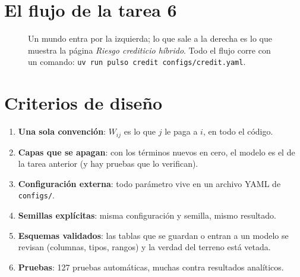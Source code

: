 \section{El flujo de la tarea 6}
\begin{figure}[h]
\centering
{}
\caption{Un mundo entra por la izquierda; lo que sale a la derecha es lo que
muestra la página \emph{Riesgo crediticio híbrido}. Todo el flujo corre con un
comando: \texttt{uv run pulso credit configs/credit.yaml}.}
\end{figure}

\section{Criterios de diseño}
\begin{enumerate}
\item \textbf{Una sola convención}: $W_{ij}$ es lo que $j$ le paga a $i$, en todo el
código.
\item \textbf{Capas que se apagan}: con los términos nuevos en cero, el modelo es el
de la tarea anterior (y hay pruebas que lo verifican).
\item \textbf{Configuración externa}: todo parámetro vive en un archivo YAML de
\texttt{configs/}.
\item \textbf{Semillas explícitas}: misma configuración y semilla, mismo resultado.
\item \textbf{Esquemas validados}: las tablas que se guardan o entran a un modelo se
revisan (columnas, tipos, rangos) y la verdad del terreno está vetada.
\item \textbf{Pruebas}: 127 pruebas automáticas, muchas contra resultados analíticos.
\end{enumerate}

